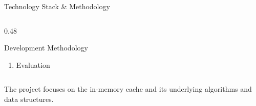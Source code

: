 \documentclass[aspectratio=169,10pt]{beamer}
\begin{document}
\begin{frame}{Technology Stack \& Methodology}
\begin{columns}[T]
\begin{column}{0.48\textwidth}
\begin{block}{Development Methodology}
\begin{enumerate}
\item Evaluation

\end{enumerate}

\end{block}

\end{column}

\end{columns}

\vfill

\begin{center}

\small
\textcolor{GEUGrey}{
The project focuses on the in-memory cache and its underlying
algorithms and data structures.
}

\end{center}

\end{frame}

\end{document}
